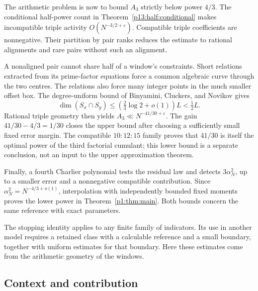 The arithmetic problem is now to bound \(A_3\) strictly below
power \(4/3\). The conditional half-power count in
Theorem~\ref{p13:half:conditional} makes incompatible triple
activity \(O(N^{-3/2+\varepsilon})\). Compatible triple
coefficients are nonnegative. Their partition by pair ranks
reduces the estimate to rational alignments and rare pairs
without such an alignment.

A nonaligned pair cannot share half of a window's constraints.
Short relations extracted from its prime-factor equations force
a common algebraic curve through the two centres. The relations
also force many integer points in the much smaller offset box.
The degree-uniform bound of Binyamini, Cluckers, and Novikov
\cite[Theorem~2, (27)]{binyaminicluckersnovikov2024} gives
\[
 \dim(S_x\cap S_y)\le
       \left(\tfrac23\log2+o(1)\right)L<\tfrac12L.
\]
Rational triple geometry then yields
\(A_3\ll N^{-41/30+\varepsilon}\).
The gain \(41/30-4/3=1/30\) closes the upper bound after
choosing a sufficiently small fixed error margin.
The compatible \(10:12:15\) family proves that \(41/30\)
is itself the optimal power of the third factorial cumulant;
this lower bound is a separate conclusion, not an input to
the upper approximation theorem.

Finally, a fourth Charlier polynomial tests the residual law
and detects \(3\alpha_N^2\), up to a smaller error and a
nonnegative compatible contribution. Since
\(\alpha_N^2=N^{-4/3+o(1)}\), interpolation with independently
bounded fixed moments proves the lower power in
Theorem~\ref{p1:thm:main}. Both bounds concern the same
reference with exact parameters.

The stopping identity applies to any finite family of indicators.
Its use in another model requires a retained class with a
calculable reference and a small boundary, together with
uniform estimates for that boundary. Here these estimates
come from the arithmetic geometry of the windows.

\subsection{Context and contribution}

